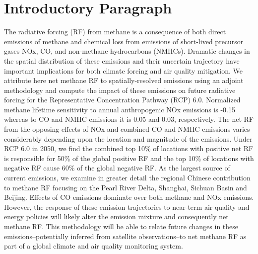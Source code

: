 \section*{Introductory Paragraph}

The radiative forcing (RF) from methane is a consequence of both direct emissions of methane and chemical loss from emissions of short-lived precursor gases NOx, CO, and non-methane hydrocarbons (NMHCs). Dramatic changes in the spatial distribution of these emissions and their uncertain trajectory have important implications for both climate forcing and air quality mitigation.  We attribute here net methane RF  to spatially-resolved emissions using an adjoint methodology and compute the impact of these emissions on future radiative forcing for the Representative Concentration Pathway (RCP) 6.0.  Normalized methane lifetime sensitivity to annual anthropogenic NOx emissions is -0.15 whereas to CO and NMHC emissions it is 0.05 and 0.03, respectively. The net RF from the opposing effects of NOx and combined CO and NMHC emissions varies considerably depending upon the location and magnitude of the emissions.  Under RCP 6.0 in 2050,  we find the combined top 10\% of locations with positive net RF is responsible for 50\% of the global positive RF and the top 10\% of locations with negative RF cause 60\% of the global negative RF. As the largest source of current emissions, we examine in greater detail the regional Chinese contribution to methane RF focusing on the Pearl River Delta, Shanghai, Sichuan Basin and Beijing. Effects of CO emissions dominate over both methane and NOx emissions. However, the response of these emission trajectories to near-term air quality and energy policies will likely alter the emission mixture and consequently net methane RF. This methodology will be able to relate future changes in these emissions--potentially inferred from satellite observations--to net methane RF  as part of a global climate and air quality monitoring system. 